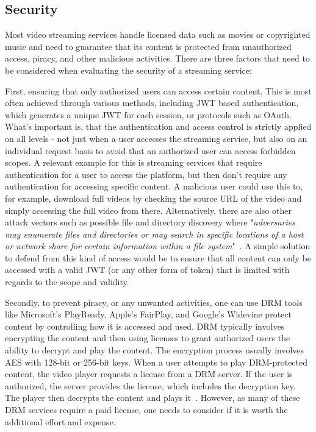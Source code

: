 \subsection{Security}

Most video streaming services handle licensed data such as movies or copyrighted music and need to guarantee that its content is protected from unauthorized access, piracy, and other malicious activities.
There are three factors that need to be considered when evaluating the security of a streaming service: 

First, ensuring that only authorized users can access certain content. This is most often achieved through various methods, including \ac{JWT} based authentication, which generates a unique \ac{JWT} for each session, or protocols such as OAuth. What's important is, that the authentication and access control is strictly applied on all levels - not just when a user accesses the streaming service, but also on an individual request basis to avoid that an authorized user can access forbidden scopes. A relevant example for this is streaming services that require authentication for a user to access the platform, but then don't require any authentication for accessing specific content. A malicious user could use this to, for example, download full videos by checking the source URL of the video and simply accessing the full video from there. Alternatively, there are also other attack vectors such as possible file and directory discovery where "\textit{adversaries may enumerate files and directories or may search in specific locations of a host or network share for certain information within a file system}"~\parencite{mitre}. A simple solution to defend from this kind of access would be to ensure that all content can only be accessed with a valid \ac{JWT} (or any other form of token) that is limited with regards to the scope and validity.

Secondly, to prevent piracy, or any unwanted activities, one can use \ac{DRM} tools like Microsoft's PlayReady, Apple's FairPlay, and Google's Widevine protect content by controlling how it is accessed and used. \ac{DRM} typically involves encrypting the content and then using licenses to grant authorized users the ability to decrypt and play the content. The encryption process usually involves \ac{AES} with 128-bit or 256-bit keys. When a user attempts to play \ac{DRM}-protected content, the video player requests a license from a \ac{DRM} server. If the user is authorized, the server provides the license, which includes the decryption key. The player then decrypts the content and plays it~\parencite{drm}. However, as many of these \ac{DRM} services require a paid license, one needs to consider if it is worth the additional effort and expense.


